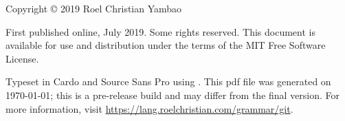 \thispagestyle{empty}

    \vspace*{\fill}
{
\small

\noindent Copyright © 2019 Roel Christian Yambao \bigskip

\noindent First published online, July 2019. Some rights reserved. This document is available for use and distribution under the terms of the MIT Free Software License.

\medskip

\noindent Typeset in Cardo and Source Sans Pro using \LuaLaTeX{}. This {\sc pdf} file was generated on \today{}; this is a pre-release build and may differ from the final version. For more information, visit \url{https://lang.roelchristian.com/grammar/git}.

}
